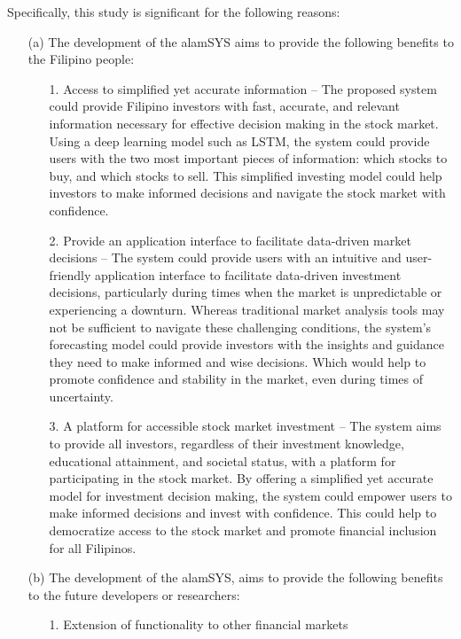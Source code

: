 Specifically, this study is significant for the following reasons:
\begin{itemize}
  \item[(a)] The development of the alamSYS aims to provide the 
  following benefits to the Filipino people:
  \begin{itemize}
    \item[1.]	Access to simplified yet accurate information 
    – The proposed system could provide Filipino investors with fast, 
    accurate, and relevant information necessary for effective decision making 
    in the stock market. Using a deep learning model such as LSTM, the system 
    could provide users with the two most important pieces of information: 
    which stocks to buy, and which stocks to sell. This simplified investing 
    model could help investors to make informed decisions and navigate the stock 
    market with confidence.
    \item[2.]	Provide an application interface to facilitate data-driven market 
    decisions – The system could provide users with an intuitive and user-friendly 
    application interface to facilitate data-driven investment decisions, 
    particularly during times when the market is unpredictable 
    or experiencing a downturn. Whereas traditional market analysis tools may not 
    be sufficient to navigate these challenging conditions, the system's forecasting
    model could provide investors with the insights and guidance 
    they need to make informed and wise decisions. Which would help to promote 
    confidence and stability in the market, even during times of uncertainty.
    \item[3.]	A platform for accessible stock market investment – 
    The system aims to provide all investors, regardless of their 
    investment knowledge, educational attainment, and societal status, 
    with a platform for participating in the stock market. By offering a 
    simplified yet accurate model for investment decision making, the 
    system could empower users to make informed decisions and invest with confidence. 
    This could help to democratize access to the stock market and promote financial 
    inclusion for all Filipinos.
  \end{itemize}
  \item[(b)] The development of the alamSYS, aims to provide the following benefits 
  to the future developers or researchers:
  \begin{itemize}
    \item[1.]	Extension of functionality to other financial markets 

\end{itemize}
\end{itemize}
